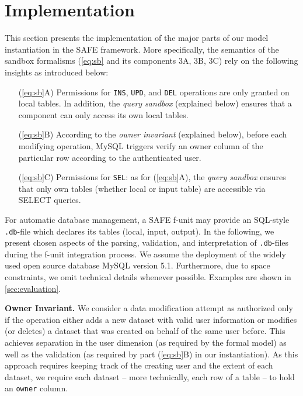 \documentclass{src/acm_proc_article-sp} \else
\newcommand\myparagraph[1]{\medskip\noindent\textbf{#1.}}
\newcommand\SAFE{SAFE\xspace}
\begin{document}
   \section{Implementation}
\label{implementation}

This section presents the implementation of the major parts of our
model instantiation in the \SAFE framework. More specifically, the
semantics of the sandbox formalisms (\autoref{eq:sb} and its
components 3A, 3B, 3C) rely on the following insights as introduced
below:
\vspace{-\parskip}
\begin{itemize}
  \setlength\itemsep{0pt}

\item[(\ref{eq:sb}A)] \vspace{-1mm} Permissions for \texttt{INS}, \texttt{UPD}, and
\texttt{DEL} operations are only granted on local tables. In
addition, the \emph{query sandbox} (explained below) ensures that a
component can only access its own local tables.

\item[(\ref{eq:sb}B)] According to the \emph{owner invariant}
(explained below), before each modifying operation, MySQL triggers
verify an owner column of the particular row according to the
authenticated user.

\item[(\ref{eq:sb}C)] Permissions for \texttt{SEL}: as for
(\ref{eq:sb}A), the \emph{query sandbox} ensures that only own tables
(whether local or input table) are accessible via SELECT queries.

\end{itemize}
\vspace{-\parskip}
For automatic database management, a \SAFE f-unit may provide
an SQL-style \texttt{.db}-file which declares its tables (local,
input, output). In the following, we present
chosen aspects of the parsing, validation, and interpretation of
\texttt{.db}-files during the f-unit integration process.
We assume the deployment of the widely used open source database
MySQL version 5.1. Furthermore, due to space constraints, we omit
technical details whenever possible.
Examples are shown in \autoref{sec:evaluation}.


\myparagraph{Owner Invariant}
We consider a data modification attempt as authorized only if the
operation either adds a new dataset with valid user information or
modifies (or deletes) a dataset that was created on behalf of the
same user before. This achieves separation in the
user dimension (as required by the formal model) as well as the
 validation (as required by part (\ref{eq:sb}B)
in our instantiation). As this approach requires keeping track of the
creating user and the extent of each dataset, we require each dataset
-- more technically, each row of a table -- to hold an \texttt{owner}
column.
\end{document}

